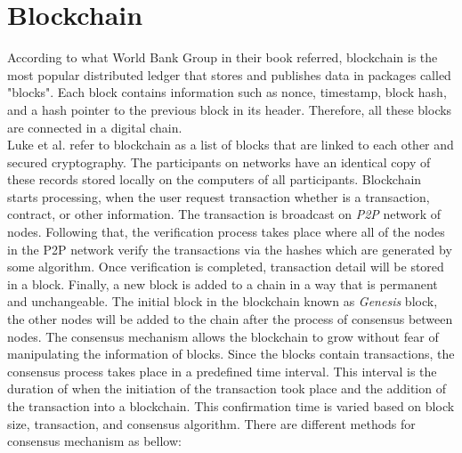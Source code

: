 \section{Blockchain} According to what World Bank Group \cite{DLT} in their book referred, blockchain is the most popular distributed ledger that stores and publishes data in packages called "blocks". Each block contains information such as nonce, timestamp, block hash, and a hash pointer to the previous block in its header. Therefore, all these blocks are connected in a digital chain\cite{DLT}. \\
Luke et al.\cite{Luke} refer to blockchain as a list of blocks that are linked to each other and secured cryptography. The participants on networks have an identical copy of these records stored locally on the computers of all participants. Blockchain starts processing, when the user request transaction whether is a transaction, contract, or other information. The transaction is broadcast on \textit{P2P} network of nodes. Following that, the verification process takes place where all of the nodes in the P2P network verify the transactions via the hashes which are generated by some algorithm. Once verification is completed, transaction detail will be stored in a block. Finally, a new block is added to a chain in a way that is permanent and unchangeable\cite{Luke}. The initial block in the blockchain known as \textit{Genesis} block, the other nodes will be added to the chain after the process of consensus between nodes. The consensus mechanism allows the blockchain to grow without fear of manipulating the information of blocks. Since the blocks contain transactions, the consensus process takes place in a predefined time interval. This interval is the duration of when the initiation of the transaction took place and the addition of the transaction into a blockchain. This confirmation time is varied based on block size, transaction, and consensus algorithm. There are different methods for consensus mechanism as bellow: 
